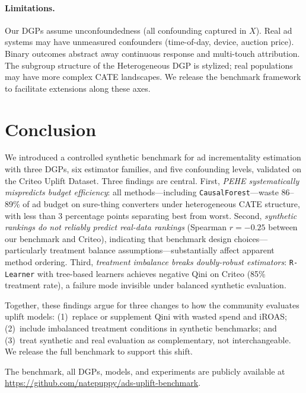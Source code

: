 \documentclass[10pt]{article}
\newcommand{\rlearner}{\texttt{R-Learner}\xspace}
\newcommand{\causalforest}{\texttt{CausalForest}\xspace}
\begin{document}
\paragraph{Limitations.}
Our DGPs assume unconfoundedness (all confounding captured in $X$). Real
ad systems may have unmeasured confounders (time-of-day, device, auction
price). Binary outcomes abstract away continuous response and multi-touch
attribution. The subgroup structure of the Heterogeneous DGP is stylized;
real populations may have more complex CATE landscapes. We release the
benchmark framework to facilitate extensions along these axes.

\section{Conclusion}
\label{sec:conclusion}

We introduced a controlled synthetic benchmark for ad incrementality estimation
with three DGPs, six estimator families, and five confounding levels, validated
on the Criteo Uplift Dataset. Three findings are central. First, \emph{PEHE
systematically mispredicts budget efficiency}: all methods---including
\causalforest---waste 86--89\% of ad budget on sure-thing converters under
heterogeneous CATE structure, with less than 3 percentage points separating
best from worst. Second, \emph{synthetic rankings do not reliably predict
real-data rankings} (Spearman $r=-0.25$ between our benchmark and Criteo),
indicating that benchmark design choices---particularly treatment balance
assumptions---substantially affect apparent method ordering. Third, \emph{
treatment imbalance breaks doubly-robust estimators}: \rlearner with tree-based
learners achieves negative Qini on Criteo (85\% treatment rate), a failure
mode invisible under balanced synthetic evaluation.

Together, these findings argue for three changes to how the community evaluates
uplift models: (1)~replace or supplement Qini with wasted spend and iROAS;
(2)~include imbalanced treatment conditions in synthetic benchmarks; and
(3)~treat synthetic and real evaluation as complementary, not interchangeable.
We release the full benchmark to support this shift.

The benchmark, all DGPs, models, and experiments are publicly available at
\href{https://github.com/natepuppy/ads-uplift-benchmark}{https://github.com/natepuppy/ads-uplift-benchmark}.



\end{document}
